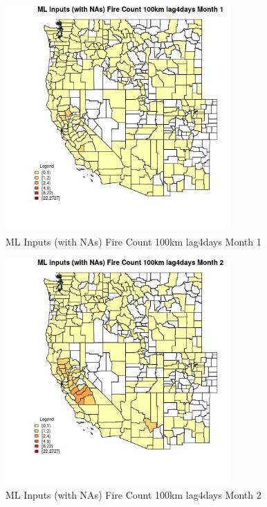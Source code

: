 \begin{figure} 
\centering  
\includegraphics[width=0.77\textwidth]{Code_Outputs/Report_ML_input_PM25_Step4_part_f_de_duplicated_aveswNAs_CountyFire_Count_100km_lag4daysmedianMonth1.jpg} 
\caption{\label{fig:Report_ML_input_PM25_Step4_part_f_de_duplicated_aveswNAsCountyFire_Count_100km_lag4daysmedianMonth1}ML Inputs (with NAs) Fire Count 100km lag4days Month 1} 
\end{figure} 
 

\begin{figure} 
\centering  
\includegraphics[width=0.77\textwidth]{Code_Outputs/Report_ML_input_PM25_Step4_part_f_de_duplicated_aveswNAs_CountyFire_Count_100km_lag4daysmedianMonth2.jpg} 
\caption{\label{fig:Report_ML_input_PM25_Step4_part_f_de_duplicated_aveswNAsCountyFire_Count_100km_lag4daysmedianMonth2}ML Inputs (with NAs) Fire Count 100km lag4days Month 2} 
\end{figure} 
 


